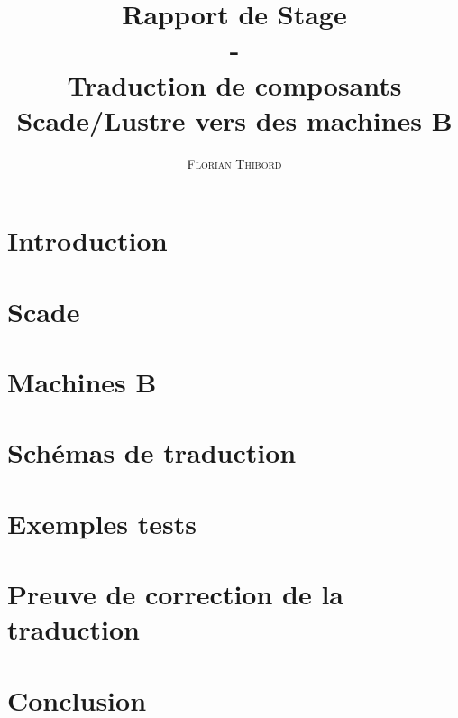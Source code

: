 \documentclass[11pt]{report}
\title{Rapport de Stage \\ - \\ Traduction de composants Scade/Lustre vers des
  machines B}
\author{\textsc{Florian Thibord}}
\begin{document}
\maketitle
\clearpage

\tableofcontents 
\newpage

\chapter{Introduction}


\chapter{Scade}


\chapter {Machines B}


\chapter{Schémas de traduction}


\chapter{Exemples tests}


\chapter{Preuve de correction de la traduction}


\chapter{Conclusion}

\end{document}
